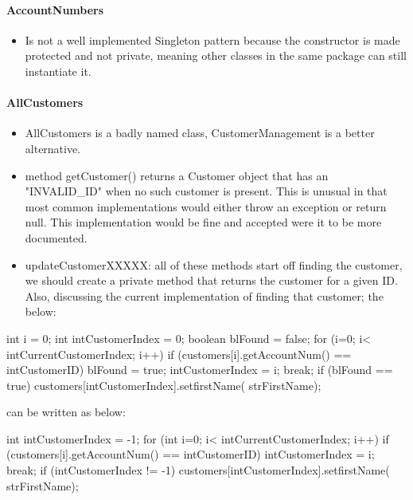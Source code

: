 \paragraph{AccountNumbers}

\begin{itemize}
    \item Is not a well implemented Singleton pattern because the constructor is made protected and not private, meaning other classes in the same package can still instantiate it.
\end{itemize}

\paragraph{AllCustomers}
\begin{itemize}
    \item AllCustomers is a badly named class, CustomerManagement is a better alternative. 

    \item method getCustomer() returns a Customer object that has an "INVALID\_ID" when no such customer is present. This is unusual in that most common implementations would either throw an exception or return null. This implementation would be fine and accepted were it to be more documented. 

    \item updateCustomerXXXXX: all of these methods start off finding the customer, we should create a private method that returns the customer for a given ID. Also, discussing the current implementation of finding that customer; the below: 
\end{itemize}

\begin{javacode}
int i = 0;
int intCustomerIndex = 0;
boolean blFound = false;
for (i=0; i< intCurrentCustomerIndex; i++) {
    if (customers[i].getAccountNum() == intCustomerID) {
        blFound = true;
        intCustomerIndex = i;
        break;
    }
}
if (blFound == true) {
    customers[intCustomerIndex].setfirstName( strFirstName);
}
\end{javacode}
can be written as below: 
\begin{javacode}
int intCustomerIndex = -1;
for (int i=0; i< intCurrentCustomerIndex; i++) {
    if (customers[i].getAccountNum() == intCustomerID) {
        intCustomerIndex = i;
        break;
    }
}
if (intCustomerIndex != -1) {
    customers[intCustomerIndex].setfirstName( strFirstName);
}
\end{javacode}

